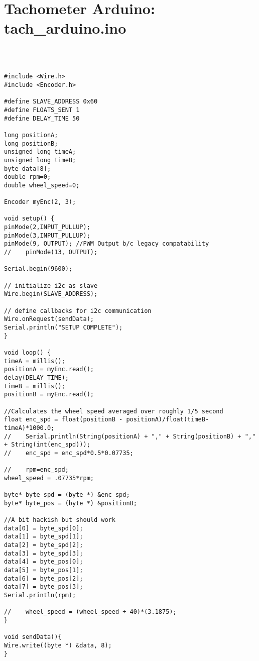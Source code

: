 \section*{Tachometer Arduino: tach\_arduino.ino}
\begin{lstlisting}[breaklines=true,basicstyle=\tiny]



#include <Wire.h>
#include <Encoder.h>

#define SLAVE_ADDRESS 0x60
#define FLOATS_SENT 1
#define DELAY_TIME 50

long positionA;
long positionB;
unsigned long timeA;
unsigned long timeB;
byte data[8];
double rpm=0;
double wheel_speed=0;

Encoder myEnc(2, 3);

void setup() {
pinMode(2,INPUT_PULLUP);
pinMode(3,INPUT_PULLUP);
pinMode(9, OUTPUT); //PWM Output b/c legacy compatability
//    pinMode(13, OUTPUT);

Serial.begin(9600);

// initialize i2c as slave
Wire.begin(SLAVE_ADDRESS);

// define callbacks for i2c communication  
Wire.onRequest(sendData);
Serial.println("SETUP COMPLETE");
}

void loop() {
timeA = millis();
positionA = myEnc.read();
delay(DELAY_TIME);
timeB = millis();
positionB = myEnc.read();

//Calculates the wheel speed averaged over roughly 1/5 second
float enc_spd = float(positionB - positionA)/float(timeB-timeA)*1000.0;
//    Serial.println(String(positionA) + "," + String(positionB) + "," + String(int(enc_spd)));
//    enc_spd = enc_spd*0.5*0.07735;

//    rpm=enc_spd; 
wheel_speed = .07735*rpm;

byte* byte_spd = (byte *) &enc_spd;
byte* byte_pos = (byte *) &positionB;

//A bit hackish but should work
data[0] = byte_spd[0];
data[1] = byte_spd[1];
data[2] = byte_spd[2];
data[3] = byte_spd[3];
data[4] = byte_pos[0];
data[5] = byte_pos[1];
data[6] = byte_pos[2];
data[7] = byte_pos[3];
Serial.println(rpm);

//    wheel_speed = (wheel_speed + 40)*(3.1875);
}

void sendData(){
Wire.write((byte *) &data, 8);
}

\end{lstlisting}


